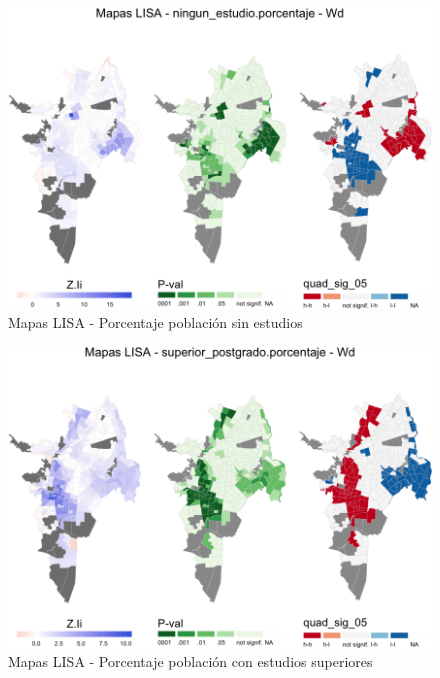 \documentclass[12pt,]{book}
\begin{document}
\begin{figure}
\includegraphics[width=1\linewidth]{tesis-unigis_files/figure-latex/lisa-sinestudio-1} \caption{Mapas LISA - Porcentaje población sin estudios}\label{fig:lisa-sinestudio}
\end{figure}\begin{figure}
\includegraphics[width=1\linewidth]{tesis-unigis_files/figure-latex/lisa-superiores-1} \caption{Mapas LISA - Porcentaje población con estudios superiores}\label{fig:lisa-superiores}
\end{figure}\begin{figure}

\end{figure}
\end{document}
